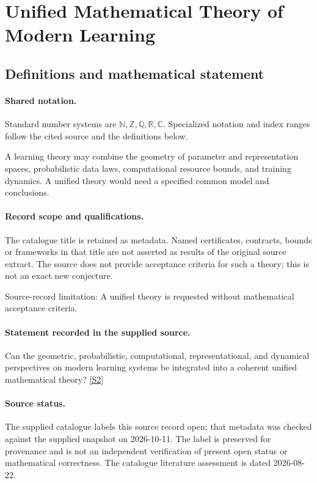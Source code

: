 \documentclass[11pt]{article}
\newcommand{\sref}[2]{\hyperlink{source:#1:#2}{[S#2]}}
\begin{document}
\section{Unified Mathematical Theory of Modern Learning}\label{statement}

\subsection{Definitions and mathematical statement}

\paragraph{Shared notation.}Standard number systems are $\mathbb N,\mathbb Z,\mathbb Q,\mathbb R,\mathbb C$. Specialized notation and index ranges follow the cited source and the definitions below.


A learning theory may combine the geometry of parameter and representation spaces, probabilistic data laws, computational resource bounds, and training dynamics. A unified theory would need a specified common model and conclusions.
\paragraph{Record scope and qualifications.}
The catalogue title is retained as metadata. Named certificates, contracts, bounds or frameworks in that title are not asserted as results of the original source extract.
The source does not provide acceptance criteria for such a theory; this is not an exact new conjecture.

Source-record limitation: A unified theory is requested without mathematical acceptance criteria.
\paragraph{Statement recorded in the supplied source.}
Can the geometric, probabilistic, computational, representational, and dynamical perspectives on modern learning systems be integrated into a coherent unified mathematical theory? \sref{statement}{2}
\paragraph{Source status.}
The supplied catalogue labels this source record open; that metadata was checked against the supplied snapshot on 2026-10-11. The label is preserved for provenance and is not an independent verification of present open status or mathematical correctness. The catalogue literature assessment is dated 2026-08-22.
\end{document}
